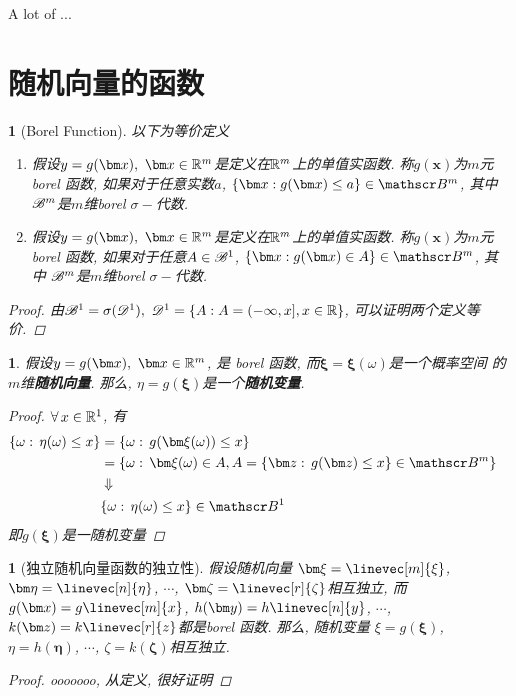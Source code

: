 A lot of ...

\section{随机向量的函数}

\newtheorem{borel_function_def}[theorem_root]{}
\begin{borel_function_def}[Borel Function]
以下为等价定义\par
\begin{enumerate}
\item 假设\(y = g(\bm x),\,\,\bm x\in\Rs^m\)是定义在\(\Rs^m\)上的单值实函数.
称\(g(\bm x)\)为\(m\)元 borel 函数, 如果对于任意实数\(a\), \(\{\bm x:g(\bm x)\le a\}\in\sgmb^m\), 其中
\(\sgmb^m\)是\(m\)维borel \(\sigma-\)代数.
\item 假设\(y = g(\bm x),\,\,\bm x\in\Rs^m\)是定义在\(\Rs^m\)上的单值实函数.
称\(g(\bm x)\)为\(m\)元 borel 函数, 如果对于任意\(A\in\sgmb^1\), \(\{\bm x:g(\bm x)\in A\}\in\sgmb^m\), 其中
\(\sgmb^m\)是\(m\)维borel \(\sigma-\)代数.
\end{enumerate}
\begin{proof}由\(\sgmb^1 = \sigma(\algr^1),\,\,\algr^1 = \{A: A = (-\infty,x], x\in\Rs\}\), 可以证明两个定义等价.\end{proof}
\end{borel_function_def}

\newtheorem{borel_function_apply_random_var}[theorem_root]{\lemma}
\begin{borel_function_apply_random_var}
    假设\(y = g(\bm x),\,\,\bm x\in\Rs^m\), 是 borel 函数, 而\(\bm\xi = \bm\xi(\omega)\)是一个概率空间
    \prbsp 的\(m\)维{\bf 随机向量}. 那么, \(\eta = g(\bm\xi)\)是一个{\bf 随机变量}.
    \begin{proof}
    \(\forall\,x\in\Rs^1\), 有
    \begin{align}
    \{\omega:\, \eta(\omega)\le x\} &=
    \{\omega:\, g(\bm\xi(\omega))\le x\}\cr
    &= \{\omega:\, \bm\xi(\omega)\in A, A=\{\bm z:\,g(\bm z)\le x\}\in\sgmb^m\}\cr
    &\Downarrow\cr
    &\{\omega:\, \eta(\omega)\le x\}\in\sgmb^1
    \end{align}
    即\(g(\bm\xi)\)是一随机变量
    \end{proof}
\end{borel_function_apply_random_var}

\newtheorem{independentity_of_function_of_random_vector}[theorem_root]{\theorem}
\begin{independentity_of_function_of_random_vector}[独立随机向量函数的独立性]
    假设随机向量
    \(\bm\xi = \linevec[m]{\xi}\),
    \(\bm\eta = \linevec[n]{\eta}\),
    \(\cdots\),
    \(\bm\zeta = \linevec[r]{\zeta}\)相互独立, 而
    \(g(\bm x) = g\linevec[m]{x}\),
    \(h(\bm y) = h\linevec[n]{y}\),
    \(\cdots\),
    \(k(\bm z) = k\linevec[r]{z}\)都是borel 函数. 那么, 随机变量
    \(\xi = g(\bm \xi)\), 
    \(\eta = h(\bm \eta)\), 
    \(\cdots\),
    \(\zeta = k(\bm \zeta)\)相互独立.
    \begin{proof}
        ooooooo, 从定义, 很好证明
    \end{proof}
\end{independentity_of_function_of_random_vector}

